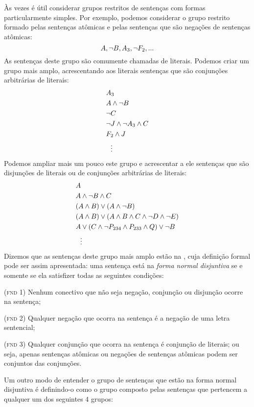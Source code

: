 Às vezes é útil considerar grupos restritos de sentenças com formas particularmente simples.
Por exemplo, podemos considerar o grupo restrito formado pelas sentenças atômicas e pelas sentenças que são negações de sentenças atômicas:
$$A, \neg B, A_3, \neg F_2, ...$$
As sentenças deste grupo são comumente chamadas de literais.
Podemos criar um grupo mais amplo, acrescentando aos literais sentenças que são conjunções arbitrárias de literais:
	\begin{align*}
			& A_3 \\
			& A \wedge \neg B \\
			& \neg C \\
			& \neg J \wedge \neg A_3 \wedge  C \\
			& F_2 \wedge  J \\
			& \ \ \vdots
	\end{align*}
Podemos ampliar mais um pouco este grupo e acrescentar a ele sentenças que são disjunções de literais ou de conjunções arbitrárias de literais:
	\begin{align*}
  		& A \\
  		& A \wedge \lnot B \wedge C\\
  		& (A \wedge B) \vee (A \wedge \neg B)\\
  		& (A \wedge B) \vee (A \wedge  B \wedge C \wedge \neg D \wedge \neg E)\\
  		& A \vee (C \wedge \neg P_{234} \wedge P_{233} \wedge Q) \vee \neg B\\
  		& \ \ \vdots
	\end{align*}
Dizemos que as sentenças deste grupo mais amplo estão na , cuja definição formal pode ser assim apresentada:
uma sentença está na \textit{forma normal disjuntiva} se e somente se ela satisfizer todas as seguintes condições:
	\begin{earg}
		\item[(\textsc{fnd 1})] Nenhum conectivo que não seja negação, conjunção ou disjunção ocorre na sentença;
		\item[(\textsc{fnd 2})] Qualquer negação que ocorra na sentença é a negação de uma letra sentencial;
		\item[(\textsc{fnd 3})] Qualquer conjunção que ocorra na sentença é conjunção de literais; ou seja, apenas sentenças atômicas ou negações de sentenças atômicas podem ser conjuntos das conjunções.
	\end{earg}
Um outro modo de entender o grupo de sentenças que estão na forma normal disjuntiva é definindo-o como o grupo composto pelas sentenças que pertencem a qualquer um dos seguintes 4 grupos:
